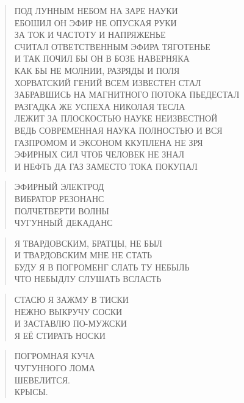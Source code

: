 \poemtitle{***}
\begin{verse}
ПОД ЛУННЫМ  НЕБОМ НА ЗАРЕ НАУКИ\\
ЕБОШИЛ ОН ЭФИР НЕ ОПУСКАЯ РУКИ\\
ЗА ТОК И ЧАСТОТУ И НАПРЯЖЕНЬЕ\\
СЧИТАЛ ОТВЕТСТВЕННЫМ ЭФИРА ТЯГОТЕНЬЕ\\
И ТАК ПОЧИЛ  БЫ ОН В БОЗЕ НАВЕРНЯКА\\
КАК БЫ НЕ МОЛНИИ, РАЗРЯДЫ И ПОЛЯ\\
ХОРВАТСКИЙ ГЕНИЙ ВСЕМ ИЗВЕСТЕН СТАЛ\\
ЗАБРАВШИСЬ НА МАГНИТНОГО ПОТОКА ПЬЕДЕСТАЛ\\
РАЗГАДКА ЖЕ УСПЕХА НИКОЛАЯ ТЕСЛА\\
ЛЕЖИТ ЗА ПЛОСКОСТЬЮ НАУКЕ НЕИЗВЕСТНОЙ\\
ВЕДЬ СОВРЕМЕННАЯ НАУКА ПОЛНОСТЬЮ И ВСЯ\\
ГАЗПРОМОМ И ЭКСОНОМ ККУПЛЕНА НЕ ЗРЯ\\
ЭФИРНЫХ СИЛ ЧТОБ ЧЕЛОВЕК НЕ ЗНАЛ\\
И НЕФТЬ ДА ГАЗ ЗАМЕСТО ТОКА ПОКУПАЛ
\end{verse}

\poemtitle{***}
\begin{verse}
ЭФИРНЫЙ ЭЛЕКТРОД\\
ВИБРАТОР РЕЗОНАНС\\
ПОЛЧЕТВЕРТИ ВОЛНЫ\\
ЧУГУННЫЙ ДЕКАДАНС
\end{verse}

\poemtitle{***}
\begin{verse}
Я ТВАРДОВСКИМ, БРАТЦЫ, НЕ БЫЛ\\
И ТВАРДОВСКИМ МНЕ НЕ СТАТЬ\\
БУДУ Я В ПОГРОМЕНГ СЛАТЬ ТУ НЕБЫЛЬ\\
ЧТО НЕБЫДЛУ СЛУШАТЬ ВСЛАСТЬ
\end{verse}

\poemtitle{***}
\begin{verse}
СТАСЮ Я ЗАЖМУ В ТИСКИ\\
НЕЖНО ВЫКРУЧУ СОСКИ\\
И ЗАСТАВЛЮ ПО-МУЖСКИ\\
Я ЕЁ СТИРАТЬ НОСКИ
\end{verse}

\poemtitle{***}
\begin{verse}
ПОГРОМНАЯ КУЧА\\
ЧУГУННОГО ЛОМА\\
ШЕВЕЛИТСЯ.\\
КРЫСЫ.
\end{verse}

